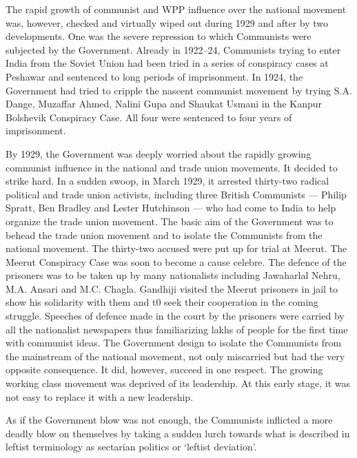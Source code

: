 \begin{multicols}{2}
The rapid growth of communist and WPP influence over the national movement was, however, checked and virtually wiped out during 1929 and after by two developments. One was the severe repression to which Communists were subjected by the Government. Already in 1922--24, Communists trying to enter India from the Soviet Union had been tried in a series of conspiracy cases at Peshawar and sentenced to long periods of imprisonment. In 1924, the Government had tried to cripple the nascent communist movement by trying S.A. Dange, Muzaffar Ahmed, Nalini Gupa and Shaukat Usmani in the Kanpur Bolshevik Conspiracy Case. All four were sentenced to four years of imprisonment. 

By 1929, the Government was deeply worried about the rapidly growing communist influence in the national and trade union movements. It decided to strike hard. In a sudden swoop, in March 1929, it arrested thirty-two radical political and trade union activists, including three British Communists --- Philip Spratt, Ben Bradley and Lester Hutchinson --- who had come to India to help organize the trade union movement. The basic aim of the Government was to behead the trade union movement and to isolate the Communists from the national movement. The thirty-two accused were put up for trial at Meerut. The Meerut Conspiracy Case was soon to become a cause celebre. The defence of the prisoners was to be taken up by many nationalists including Jawaharlal Nehru, M.A. Ansari and M.C. Chagla. Gandhiji visited the Meerut prisoners in jail to show his solidarity with them and t0 seek their cooperation in the coming struggle. Speeches of defence made in the court by the prisoners were carried by all the nationalist newspapers thus familiarizing lakhs of people for the first time with communist ideas. The Government design to isolate the Communists from the mainstream of the national movement, not only miscarried but had the very opposite consequence. It did, however, succeed in one respect. The growing working class movement was deprived of its leadership. At this early stage, it was not easy to replace it with a new leadership. 

As if the Government blow was not enough, the Communists inflicted a more deadly blow on themselves by taking a sudden lurch towards what is described in leftist terminology as sectarian politics or `leftist deviation'. 


\end{multicols}
